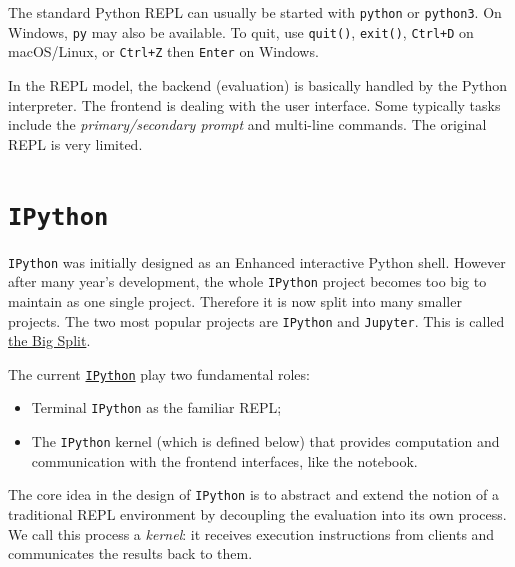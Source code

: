 \documentclass[
  letterpaper,
  DIV=11,
  numbers=noendperiod]{scrreprt}
\providecommand{\tightlist}{%
  \setlength{\itemsep}{0pt}\setlength{\parskip}{0pt}}
\theoremstyle{definition}
\theoremstyle{definition}
\theoremstyle{plain}
\theoremstyle{plain}
\theoremstyle{remark}
\begin{document}
The standard Python REPL can usually be started with \texttt{python} or
\texttt{python3}. On Windows, \texttt{py} may also be available. To
quit, use \texttt{quit()}, \texttt{exit()}, \texttt{Ctrl+D} on
macOS/Linux, or \texttt{Ctrl+Z} then \texttt{Enter} on Windows.

\begin{tcolorbox}[enhanced jigsaw, arc=.35mm, bottomrule=.15mm, bottomtitle=1mm, breakable, colback=white, colbacktitle=quarto-callout-note-color!10!white, colframe=quarto-callout-note-color-frame, coltitle=black, left=2mm, leftrule=.75mm, opacityback=0, opacitybacktitle=0.6, rightrule=.15mm, title=\textcolor{quarto-callout-note-color}{\faInfo}\hspace{0.5em}{Note}, titlerule=0mm, toprule=.15mm, toptitle=1mm]

In the REPL model, the backend (evaluation) is basically handled by the
Python interpreter. The frontend is dealing with the user interface.
Some typically tasks include the \emph{primary/secondary prompt} and
multi-line commands. The original REPL is very limited.

\end{tcolorbox}

\section{\texorpdfstring{\texttt{IPython}}{IPython}}\label{ipython}

\texttt{IPython} was initially designed as an Enhanced interactive
Python shell. However after many year's development, the whole
\texttt{IPython} project becomes too big to maintain as one single
project. Therefore it is now split into many smaller projects. The two
most popular projects are \texttt{IPython} and \texttt{Jupyter}. This is
called \href{https://blog.jupyter.org/the-big-split-9d7b88a031a7}{the
Big Split}.

The current
\href{https://ipython.readthedocs.io/en/stable/overview.html}{\texttt{IPython}}
play two fundamental roles:

\begin{itemize}
\tightlist
\item
  Terminal \texttt{IPython} as the familiar REPL;
\item
  The \texttt{IPython} kernel (which is defined below) that provides
  computation and communication with the frontend interfaces, like the
  notebook.
\end{itemize}

The core idea in the design of \texttt{IPython} is to abstract and
extend the notion of a traditional REPL environment by decoupling the
evaluation into its own process. We call this process a \emph{kernel}:
it receives execution instructions from clients and communicates the
results back to them.
\end{document}
